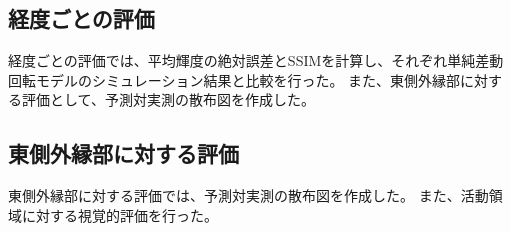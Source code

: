     \subsection{経度ごとの評価}
      経度ごとの評価では、平均輝度の絶対誤差とSSIMを計算し、それぞれ単純差動回転モデルのシミュレーション結果と比較を行った。
      また、東側外縁部に対する評価として、予測対実測の散布図を作成した。
      
    \subsection{東側外縁部に対する評価}
      東側外縁部に対する評価では、予測対実測の散布図を作成した。
      また、活動領域に対する視覚的評価を行った。